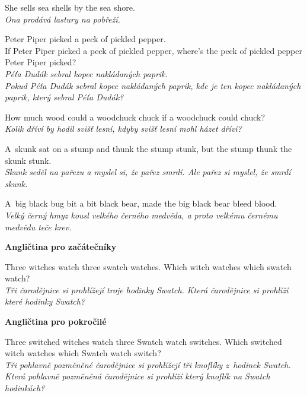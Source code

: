 \medskip

\noindent
She sells sea shells by the sea shore. \\
\textit{Ona prodává lastury na pobřeží.}

\medskip

\noindent
Peter Piper picked a peck of pickled pepper. \\
If Peter Piper picked a peck of pickled pepper, where’s the peck of pickled pepper Peter Piper picked? \\
\textit{Péťa Dudák sebral kopec nakládaných paprik. }\\
\textit{Pokud Péťa Dudák sebral kopec nakládaných paprik, kde je ten kopec nakládaných paprik, který sebral Péťa Dudák?}

\medskip

\noindent
How much wood could a woodchuck chuck if a woodchuck could chuck? \\
\textit{Kolik dříví by hodil svišť lesní, kdyby svišť lesní mohl házet dříví?}

\medskip

\noindent
A~skunk sat on a stump and thunk the stump stunk, but the stump thunk the skunk stunk. \\
\textit{Skunk seděl na pařezu a myslel si, že pařez smrdí. Ale pařez si myslel, že smrdí skunk.}

\medskip

\noindent
A~big black bug bit a bit black bear, made the big black bear bleed blood. \\
\textit{Velký černý hmyz kousl velkého černého medvěda, a proto velkému černému medvědu teče krev.}

\bigskip
\noindent
\textbf{Angličtina pro začátečníky}

\medskip

\noindent
Three witches watch three swatch watches. Which witch watches which swatch watch? \\
\textit{Tři čarodějnice si prohlížejí troje hodinky Swatch. Která čarodějnice si prohlíží které hodinky Swatch? }

\bigskip

\noindent
\textbf{Angličtina pro pokročilé}

\medskip

\noindent
Three switched witches watch three Swatch watch switches. Which switched witch watches which Swatch watch switch? \\
\textit{Tři pohlavně pozměněné čarodějnice si prohlížejí tři knoflíky z~hodinek Swatch. Která pohlavně pozměněná čarodějnice si prohlíží který knoflík na Swatch hodinkách?}

